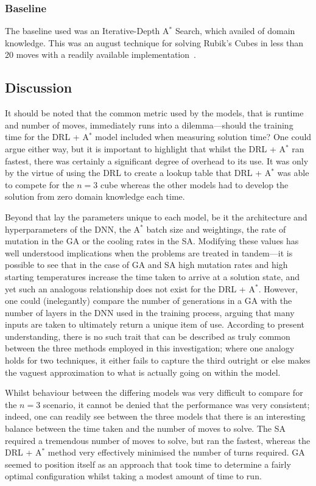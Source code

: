 \documentclass[UKenglish]{libraries/svproc}
\begin{document}
\subsubsection{Baseline}
The baseline used was an Iterative-Depth A$^{\ast}$ Search, which availed of domain knowledge. This was an august technique for solving Rubik's Cubes in less than 20 moves with a readily available implementation~\cite{Shoukat2019}.

\subsection{Discussion}
It should be noted that the common metric used by the models, that is runtime and number of moves, immediately runs into a dilemma---should the training time for the DRL + A$^{\ast}$ model included when measuring solution time?  One could argue either way, but it is important to highlight that whilst the DRL + A$^{\ast}$ ran fastest, there was certainly a significant degree of overhead to its use. It was only by the virtue of using the DRL to create a lookup table that DRL + A$^{\ast}$ was able to compete for the $n=3$ cube whereas the other models had to develop the solution from zero domain knowledge each time.

Beyond that lay the parameters unique to each model, be it the architecture and hyperparameters of the DNN, the A$^{\ast}$ batch size and weightings, the rate of mutation in the GA or the cooling rates in the SA. Modifying these values has well understood implications when the problems are treated in tandem---it is possible to see that in the case of GA and SA high mutation rates and high starting temperatures increase the time taken to arrive at a solution state, and yet such an analogous relationship does not exist for the DRL + A$^{\ast}$. However, one could (inelegantly) compare the number of generations in a GA with the number of layers in the DNN used in the training process, arguing that many inputs are taken to ultimately return a unique item of use. According to present understanding, there is no such trait that can be described as truly common between the three methods employed in this investigation; where one analogy holds for two techniques, it either fails to capture the third outright or else makes the vaguest approximation to what is actually going on within the model.

Whilst behaviour between the differing models was very difficult to compare for the $n=3$ scenario, it cannot be denied that the performance was very consistent; indeed, one can readily see between the three models that there is an interesting balance between the time taken and the number of moves to solve. The SA required a tremendous number of moves to solve, but ran the fastest, whereas the DRL + A$^{\ast}$ method very effectively minimised the number of turns required. GA seemed to position itself as an approach that took time to determine a fairly optimal configuration whilst taking a modest amount of time to run.
\end{document}
